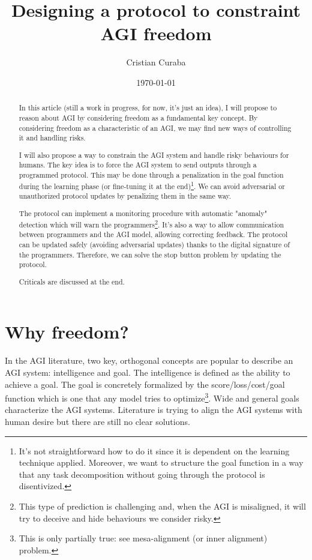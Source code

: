 \documentclass{article}
\begin{document}
\title{Designing a protocol to constraint AGI freedom}
\author{Cristian Curaba}
\date{\today}

\maketitle

\begin{abstract}
    In this article (still a work in progress, for now, it's just an idea), I will propose to reason about AGI by considering freedom as a fundamental key concept. 
    By considering freedom as a characteristic of an AGI, we may find new ways of controlling it and handling risks.
    
    I will also propose a way to constrain the AGI system and handle risky behaviours for humans. The key idea is to force the AGI system to send outputs through a programmed protocol. 
    This may be done through a penalization in the goal function during the learning phase (or fine-tuning it at the end)\footnote{It's not straightforward how to do it since it is dependent on the learning technique applied. 
    Moreover, we want to structure the goal function in a way that any task decomposition without going through the protocol is disentivized.}. 
    We can avoid adversarial or unauthorized protocol updates by penalizing them in the same way.
    
    The protocol can implement a monitoring procedure with automatic "anomaly" detection which will warn the 
    programmers\footnote{This type of prediction is challenging and, when the AGI is misaligned, it will try to deceive and hide behaviours we consider risky.}. 
    It's also a way to allow communication between programmers and the AGI model, allowing correcting feedback.
    The protocol can be updated safely (avoiding adversarial updates) thanks to the digital signature of the programmers. 
    Therefore, we can solve the stop button problem by updating the protocol. 
    
    Criticals are discussed at the end.
\end{abstract}

\section{Why freedom?}
In the AGI literature,  two key, orthogonal concepts are popular to describe an AGI system: intelligence and goal.
The intelligence is defined as the ability to achieve a goal.
The goal is concretely formalized by the score/loss/cost/goal function which is one that any model tries to optimize\footnote{This is only partially true: see mesa-alignment (or inner alignment) problem.}.
Wide and general goals characterize the AGI systems.
Literature is trying to align the AGI systems with human desire but there are still no clear solutions.
\end{document}
